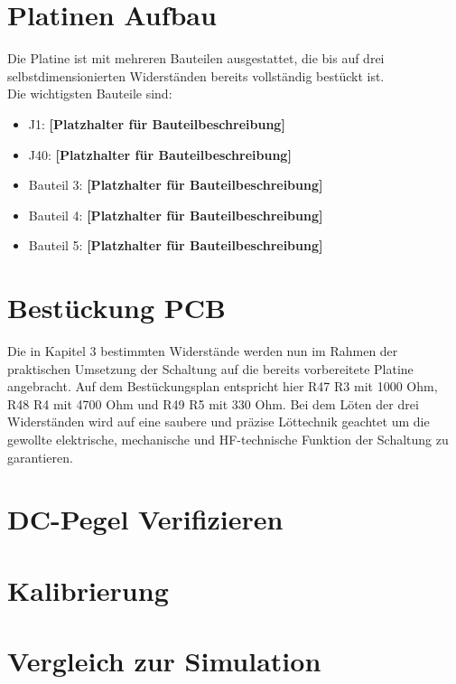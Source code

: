 
\section{Platinen Aufbau}
Die Platine ist mit mehreren Bauteilen ausgestattet, die bis auf drei selbstdimensionierten Widerständen
bereits vollständig bestückt ist. \\
Die wichtigsten Bauteile sind:
\begin{itemize}
    \item J1: \textbf{[Platzhalter für Bauteilbeschreibung]}
    \item J40: \textbf{[Platzhalter für Bauteilbeschreibung]}
    \item Bauteil 3: \textbf{[Platzhalter für Bauteilbeschreibung]}
    \item Bauteil 4: \textbf{[Platzhalter für Bauteilbeschreibung]}
    \item Bauteil 5: \textbf{[Platzhalter für Bauteilbeschreibung]}
\end{itemize}



\section{Bestückung PCB}
Die in Kapitel 3 bestimmten Widerstände werden nun im Rahmen der praktischen Umsetzung der Schaltung auf die 
bereits vorbereitete Platine angebracht. Auf dem Bestückungsplan entspricht hier R47 R3 mit 1000 Ohm, R48 R4 mit 
4700 Ohm und R49 R5 mit 330 Ohm. Bei dem Löten der drei Widerständen wird auf eine saubere und präzise Löttechnik
geachtet um die gewollte elektrische, mechanische und HF-technische Funktion der Schaltung zu garantieren. 
\section{DC-Pegel Verifizieren}
\section{Kalibrierung}
\section{Vergleich zur Simulation}
\clearpage
